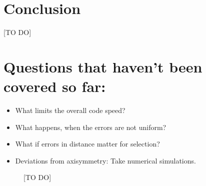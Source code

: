 \documentclass[12pt,preprint]{aastex}
\begin{document}
\section{Conclusion}

[TO DO]

\section{Questions that haven't been covered so far:}

\begin{itemize}
\item What limits the overall code speed?
\item What happens, when the errors are not uniform?
\item What if errors in distance matter for selection?
\item Deviations from axisymmetry: Take numerical simulations.
\end{itemize}



\begin{figure}
\caption{[TO DO]} 
\end{figure}

\end{document}
